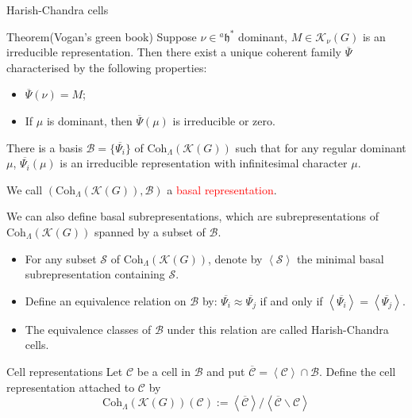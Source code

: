 \documentclass[fleqn,xcolor=dvipsnames]{beamer}
\newcommand{\CB}{{\mathcal {B}}}
\newcommand{\CC}{{\mathcal {C}}}
\newcommand{\CK}{{\mathcal {K}}}
\newcommand{\CS}{{\mathcal {S}}}
\newcommand{\fh}{\mathfrak{h}}
\renewcommand{\bar}{\overline}
\begin{document}
\begin{frame}{Harish-Chandra cells}
  \begin{block}{Theorem(Vogan's green book)}
    Suppose $\nu \in {^{a}\fh}^*$ dominant, $M \in \CK_{\nu}(G)$ is an irreducible representation. Then there exist a unique coherent family $\bar{\Psi}$ characterised by the following properties:
    \begin{itemize}
      \item $\bar{\Psi}(\nu) = M$;
      \item If $\mu$ is dominant, then $\bar{\Psi}(\mu)$ is irreducible or zero.
    \end{itemize}
  \end{block}
  \pause There is a basis $\CB = \{\bar{\Psi_i}\}$ of $\mathrm{Coh}_{\Lambda}(\CK(G))$ such that for any regular dominant $\mu$, $\bar{\Psi_i}(\mu)$ is an irreducible representation with infinitesimal character $\mu$.\par
  \pause We call $(\mathrm{Coh}_{\Lambda}(\CK(G)),\CB)$ a \textcolor{red}{basal representation}.\par
  \pause We can also define basal subrepresentations, which are subrepresentations of $\mathrm{Coh}_{\Lambda}(\CK(G))$ spanned by a subset of $\CB$. 
\end{frame}






\begin{frame}
  \begin{itemize}
    \item For any subset $\CS$ of $\mathrm{Coh}_{\Lambda}(\CK(G))$, denote by $\left \langle \CS \right \rangle$ the minimal basal subrepresentation containing $\CS$.
    \pause\item Define an equivalence relation on $\CB$ by: 
    $\bar{\Psi_i} \approx  \bar{\Psi_j}$ if and only if $\left \langle \bar{\Psi_i} \right \rangle = \left \langle \bar{\Psi_j} \right \rangle$.
    \pause\item The equivalence classes of $\CB$ under this relation are called Harish-Chandra cells.
  \end{itemize}
  
  
  
  \pause\begin{block}{Cell representations}
    Let $\CC$ be a cell in $\CB$ and put $\bar{\CC} = \left \langle \CC \right \rangle \cap \CB$. Define the cell representation attached to $\CC$ by
    \[ \mathrm{Coh}_{\Lambda}(\CK(G))(\CC) := \left \langle \bar{\CC} \right \rangle  / \left \langle \bar{\CC} \backslash \CC \right \rangle\] 
  \end{block}


  
\end{frame}
\end{document}
